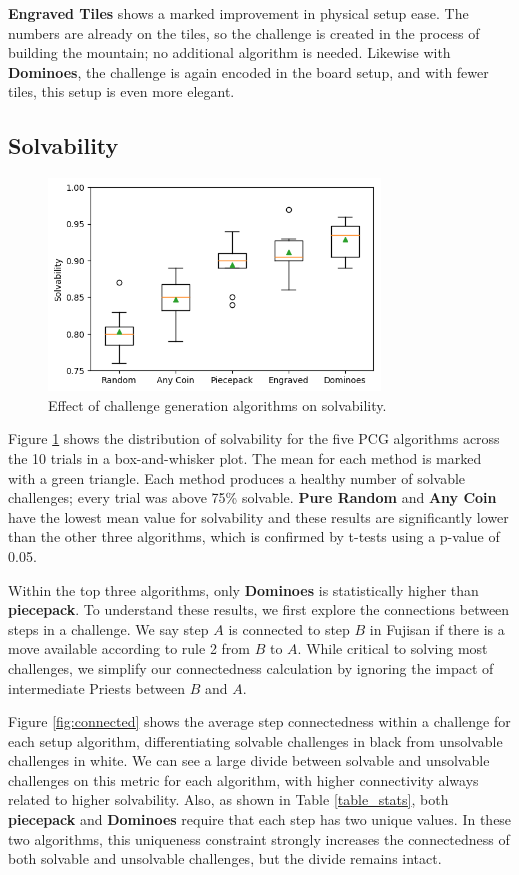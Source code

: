 \documentclass[10pt,journal,compsoc]{IEEEtran}
\begin{document}
{\bf Engraved Tiles} shows a marked improvement in physical setup ease.
The numbers are already on the tiles, so the challenge is created in the process of building the mountain; no additional algorithm is needed. Likewise with {\bf Dominoes}, the challenge is again encoded in the board setup, and with fewer tiles, this setup is even more elegant.

\subsection{Solvability}

\begin{figure}[t]
\includegraphics[width=8.8cm]{standalonesolve.png}
\caption{Effect of challenge generation algorithms on solvability.}
\label{fig:strategycomp}
\end{figure}

Figure \ref{fig:strategycomp} shows the distribution of solvability for the five PCG algorithms across the 10 trials in a box-and-whisker plot. The mean for each method is marked with a green triangle. Each method produces a healthy number of solvable challenges; every trial was above 75\% solvable. {\bf Pure Random} and {\bf Any Coin} have the lowest mean value for solvability and these results are significantly lower than the other three algorithms, which is confirmed by t-tests using a p-value of 0.05. 

Within the top three algorithms, only {\bf Dominoes} is statistically higher than {\bf piecepack}. To understand these results, we first explore the connections between steps in a challenge. We say step $A$ is connected to step $B$ in Fujisan if there is a move available according to rule 2 from $B$ to $A$. While critical to solving most challenges, we simplify our connectedness calculation by ignoring the impact of intermediate Priests between $B$ and $A$. 

Figure \ref{fig:connected} shows the average step connectedness within a challenge for each setup algorithm, differentiating solvable challenges in black from unsolvable challenges in white. We can see a large divide between solvable and unsolvable challenges on this metric for each algorithm, with higher connectivity always related to higher solvability. Also, as shown in Table \ref{table_stats}, both {\bf piecepack} and {\bf Dominoes} require that each step has two unique values. In these two algorithms, this uniqueness constraint strongly increases the connectedness of both solvable and unsolvable challenges, but the divide remains intact.
\end{document}
